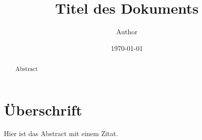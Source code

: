 \documentclass[a4paper]{article}
\title{Titel des Dokuments}
\author{Author}
\date{\today}
\begin{document}
\maketitle
\pagebreak
\tableofcontents
\pagebreak

\begin{abstract}
Abstract
\end{abstract}

\section{Überschrift}
Hier ist das Abstract mit einem Zitat\cite[p.~150]{quellenName}.

\pagebreak


    
\end{document}
